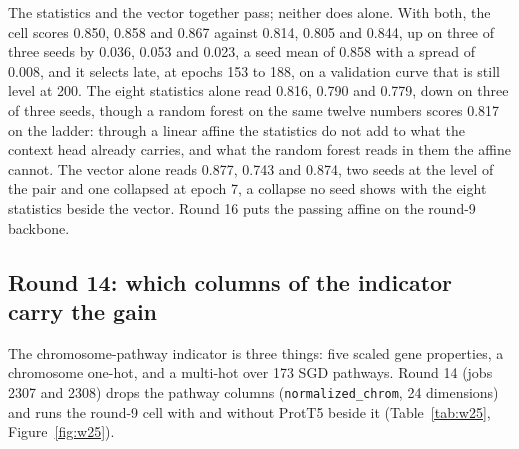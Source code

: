 


The statistics and the vector together pass; neither does alone. With both, the cell
scores 0.850, 0.858 and 0.867 against 0.814, 0.805 and 0.844, up on three of three seeds
by 0.036, 0.053 and 0.023, a seed mean of 0.858 with a spread of 0.008, and it selects
late, at epochs 153 to 188, on a validation curve that is still level at 200. The eight
statistics alone read 0.816, 0.790 and 0.779, down on three of three seeds, though a
random forest on the same twelve numbers scores 0.817 on the ladder: through a linear
affine the statistics do not add to what the context head already carries, and what the
random forest reads in them the affine cannot. The vector alone reads 0.877, 0.743 and
0.874, two seeds at the level of the pair and one collapsed at epoch 7, a collapse no
seed shows with the eight statistics beside the vector. Round 16 puts the passing affine
on the round-9 backbone.

\subsection{Round 14: which columns of the indicator carry the gain}

The chromosome-pathway indicator is three things: five scaled gene properties, a
chromosome one-hot, and a multi-hot over 173 SGD pathways. Round 14 (jobs 2307 and 2308)
drops the pathway columns (\texttt{normalized\_chrom}, 24 dimensions) and runs the
round-9 cell with and without ProtT5 beside it (Table~\ref{tab:w25},
Figure~\ref{fig:w25}).




